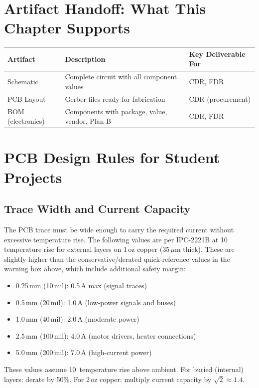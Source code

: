 \section{Artifact Handoff: What This Chapter Supports}
\begin{table}[htbp]\centering\small
\begin{tabularx}{\textwidth}{l X l}
\toprule
\textbf{Artifact} & \textbf{Description} & \textbf{Key Deliverable For} \\
\midrule
Schematic & Complete circuit with all component values & CDR, FDR \\
PCB Layout & Gerber files ready for fabrication & CDR (procurement) \\
BOM (electronics) & Components with package, value, vendor, Plan B & CDR, FDR \\
\bottomrule
\end{tabularx}
\end{table}

\section{PCB Design Rules for Student Projects}
\subsection{Trace Width and Current Capacity}\label{sec:trace_current}
The PCB trace must be wide enough to carry the required current without excessive temperature rise. The following values are per IPC-2221B at 10\,\degC{} temperature rise for external layers on 1\,oz copper (35\,$\mu$m thick). These are slightly higher than the conservative/derated quick-reference values in the warning box above, which include additional safety margin:

\begin{itemize}[nosep,leftmargin=1.5em]
\item 0.25\,mm (10\,mil): 0.5\,A max (signal traces)
\item 0.5\,mm (20\,mil): 1.0\,A (low-power signals and buses)
\item 1.0\,mm (40\,mil): 2.0\,A (moderate power)
\item 2.5\,mm (100\,mil): 4.0\,A (motor drivers, heater connections)
\item 5.0\,mm (200\,mil): 7.0\,A (high-current power)
\end{itemize}

These values assume 10\,\degC{} temperature rise above ambient. For buried (internal) layers: derate by 50\%. For 2\,oz copper: multiply current capacity by $\sqrt{2} \approx 1.4$.

